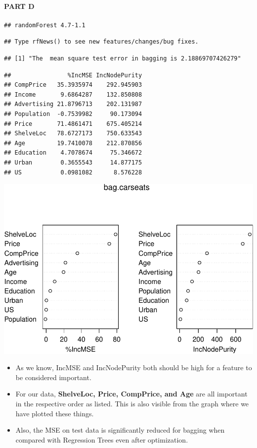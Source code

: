 \documentclass[
]{article}
\begin{document}
\hypertarget{part-d-3}{%
\paragraph{\texorpdfstring{{PART D}}{PART D}}\label{part-d-3}}

\begin{verbatim}
## randomForest 4.7-1.1
\end{verbatim}

\begin{verbatim}
## Type rfNews() to see new features/changes/bug fixes.
\end{verbatim}

\begin{verbatim}
## [1] "The  mean square test error in bagging is 2.18869707426279"
\end{verbatim}

\begin{verbatim}
##                %IncMSE IncNodePurity
## CompPrice   35.3935974    292.945903
## Income       9.6864287    132.850808
## Advertising 21.8796713    202.131987
## Population  -0.7539982     90.173094
## Price       71.4861471    675.405214
## ShelveLoc   78.6727173    750.633543
## Age         19.7410078    212.870856
## Education    4.7078674     75.346672
## Urban        0.3655543     14.877175
## US           0.0981082      8.576228
\end{verbatim}

\begin{center}\includegraphics{Disha_Gandhi_Take_Home_Exam_PDF_files/figure-latex/unnamed-chunk-76-1} \end{center}

\begin{itemize}
\item
  As we know, IncMSE and IncNodePurity both should be high for a feature
  to be considered important.
\item
  For our data, \textbf{ShelveLoc, Price, CompPrice, and Age} are all
  important in the respective order as listed. This is also visible from
  the graph where we have plotted these things.
\item
  Also, the MSE on test data is significantly reduced for bagging when
  compared with Regression Trees even after optimization.
\end{itemize}
\end{document}
